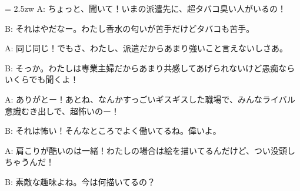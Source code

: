 \documentclass[11pt]{amsart}
\title{}
\author{}
\newenvironment{hangall}[1]{\hangindent = 2.5zw\everypar{\hangindent = 2.5zw}}{}
\begin{document}
\maketitle
\begin{hangall}{}%
A: ちょっと、聞いて！いまの派遣先に、超タバコ臭い人がいるの！



B: それはやだなー。わたし香水の匂いが苦手だけどタバコも苦手。



A: 同じ同じ！でもさ、わたし、派遣だからあまり強いこと言えないしさあ。



B: そっか。わたしは専業主婦だからあまり共感してあげられないけど愚痴ならいくらでも聞くよ！



A: ありがとー！あとね、なんかすっごいギスギスした職場で、みんなライバル意識むき出しで、超怖いのー！



B: それは怖い！そんなところでよく働いてるね。偉いよ。



A: 肩こりが酷いのは一緒！わたしの場合は絵を描いてるんだけど、つい没頭しちゃうんだ！



B: 素敵な趣味よね。今は何描いてるの？\end{hangall}
\end{document}
